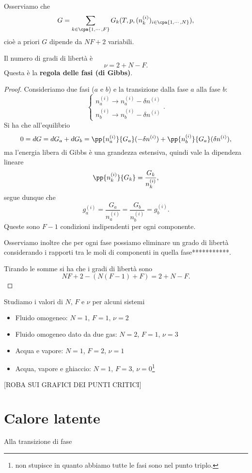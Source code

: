 \noindent
Osserviamo che
\[G=\sum_{k\in\cpa{1,\cdots, F}}G_k(T,p,(n_k^{(i)})_{i\in\cpa{1,\cdots, N}}),\]
cio\`e a priori $G$ dipende da $NF+2$ variabili.

\begin{proposition}\label{RegolaFasiGibbs}
Il numero di gradi di libert\`a \`e
\[\nu=2+N-F.\]
Questa \`e la \textbf{regola delle fasi (di Gibbs)}.
\end{proposition}
\begin{proof}
Consideriamo due fasi ($a$ e $b$) e la transizione dalla fase $a$ alla fase $b$:
\[\begin{cases}
n_a^{(i)}\to n_a^{(i)}-\delta n^{(i)}\\
n_b^{(i)}\to n_b^{(i)}-\delta n^{(i)}
\end{cases}.\]
Si ha che all'equilibrio
\[0=dG=dG_a+dG_b=\pp {n_a^{(i)}}{G_a}(-\delta n^{(i)})+\pp {n_b^{(i)}}{G_a}(\delta n^{(i)}),\]
ma l'energia libera di Gibbs \`e una grandezza estensiva, quindi vale la dipendeza lineare
\[\pp {n_k^{(i)}}{G_k}=\frac{G_k}{n_k^{(i)}},\]
segue dunque che
\[g_a^{(i)}=\frac{G_a}{n_a^{(i)}}=\frac{G_b}{n_b^{(i)}}=g_b^{(i)}.\]
Queste sono $F-1$ condizioni indipendenti per ogni componente.
\bigskip

\noindent Osserviamo inoltre che per ogni fase possiamo eliminare un grado di libert\`a considerando i rapporti tra le moli di componenti in quella fase***********.\bigskip

\noindent Tirando le somme si ha che i gradi di libert\`a sono
\[NF+2-(N(F-1)+F)=2+N-F.\]
\end{proof}



\begin{example}
Studiamo i valori di $N$, $F$ e $\nu$ per alcuni sistemi
\begin{itemize}
\item Fluido omogeneo: $N=1$, $F=1$, $\nu=2$
\item Fluido omogeneo dato da due gas: $N=2$, $F=1$, $\nu=3$
\item Acqua e vapore: $N=1$, $F=2$, $\nu=1$
\item Acqua, vapore e ghiaccio: $N=1$, $F=3$, $\nu=0$\footnote{non stupisce in quanto abbiamo tutte le fasi sono nel punto triplo.}
\end{itemize}
\end{example}


[ROBA SUI GRAFICI DEI PUNTI CRITICI]

\section{Calore latente}
Alla transizione di fase


